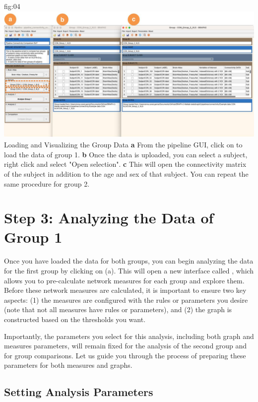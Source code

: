 \documentclass[justified]{tufte-handout}
\begin{document}

	{fig:04}
	{
	\includegraphics{fig04.jpg}
	}
	{Loading and Visualizing the Group Data}
	{
	{\bf a} From the pipeline GUI, click on  to load the data of group 1.
	{\bf b} Once the data is uploaded, you can select a subject, right click and select "Open selection".
	{\bf c} This will open the connectivity matrix of the subject in addition to the age and sex of that subject.
	You can repeat the same procedure for group 2.
	}

\section{Step 3: Analyzing the Data of Group 1}

Once you have loaded the data for both groups, you can begin analyzing the data for the first group by clicking on  (a). 
This will open a new interface called , which allows you to pre-calculate network measures for each group and explore them. 
Before these network measures are calculated, it is important to ensure two key aspects: (1) the measures are configured with the rules or parameters you desire (note that not all measures have rules or parameters), and (2) the graph is constructed based on the thresholds you want.

Importantly, the parameters you select for this analysis, including both graph and measures parameters, will remain fixed for the analysis of the second group and for group comparisons. Let us guide you through the process of preparing these parameters for both measures and graphs.

\subsection{Setting Analysis Parameters}
\end{document}
